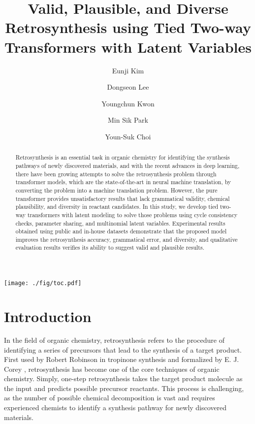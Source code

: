 \documentclass[journal=jacsat,manuscript=article]{achemso}
\author{Eunji Kim}
\author{Dongseon Lee}
\author{Youngchun Kwon}
\author{Min Sik Park}
\author{Youn-Suk Choi}
\affiliation[SAIT]
{Samsung Advanced Institute of Technology, Samsung Electronics Co., Ltd., 130 Samsung-ro, Yeongtong-gu, Suwon 16678, Republic of Korea}
\title[An \textsf{achemso} demo]
{Valid, Plausible, and Diverse Retrosynthesis using Tied Two-way Transformers with Latent Variables}
\begin{document}
	
	\begin{tocentry}
		
	\texttt{[image: ./fig/toc.pdf]}

	\end{tocentry}
	
	\begin{abstract}
	Retrosynthesis is an essential task in organic chemistry for identifying the synthesis pathways of newly discovered materials, and with the recent advances in deep learning, there have been growing attempts to solve the retrosynthesis problem through transformer models, which are the state-of-the-art in neural machine translation, by converting the problem into a machine translation problem. However, the pure transformer provides unsatisfactory results that lack grammatical validity, chemical plausibility, and diversity in reactant candidates. In this study, we develop tied two-way transformers with latent modeling to solve those problems using cycle consistency checks, parameter sharing, and multinomial latent variables. Experimental results obtained using public and in-house datasets demonstrate that the proposed model improves the retrosynthesis accuracy, grammatical error, and diversity, and qualitative evaluation results verifies its ability to suggest valid and plausible results.
	\end{abstract}
	
	\section{Introduction}
	
	In the field of organic chemistry, retrosynthesis refers to the procedure of identifying a series of precursors that lead to the synthesis of a target product. First used by Robert Robinson in tropinone synthesis \cite{robinson1917lxiii} and formalized by E. J. Corey \cite{corey1969computer,corey1967general,corey1985computer}, retrosynthesis has become one of the core techniques of organic chemistry. Simply, one-step retrosynthesis takes the target product molecule as the input and predicts possible precursor reactants. This process is challenging, as the number of possible chemical decomposition is vast and requires experienced chemists to identify a synthesis pathway for newly discovered materials.
	
\end{document}
